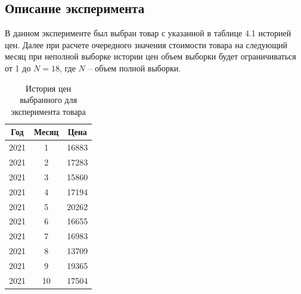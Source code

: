 \documentclass[a4paper,14pt]{extreport}
\begin{document}
\subsection{Описание эксперимента}

В данном эксперименте был выбран товар с указанной в таблице 4.1 историей цен. Далее при расчете очередного значения стоимости товара на следующий месяц при неполной выборке истории цен объем выборки будет ограничиваться от 1 до $N = 18$, где $N$ -- объем полной выборки.

\captionsetup{singlelinecheck = false, justification=raggedright}
\begin{table}[H]
	\caption{История цен выбранного для эксперимента товара}
	\begin{center}
		\begin{tabular}{| c | c | c |} 
			\hline
			
			\textbf{Год} & \textbf{Месяц} & \textbf{Цена} \\  
			
			\hline
			
			2021 & 1 & 16883 \\
			
			\hline
			
			2021 & 2 & 17283 \\
			
			\hline
			
			2021 & 3 & 15860 \\
			
			\hline
			
			2021 & 4 & 17194 \\
			
			\hline
			
			2021 & 5 & 20262 \\
			
			\hline
			
			2021 & 6 & 16655 \\
			
			\hline
			
			2021 & 7 & 16983 \\
			
			\hline
			
			2021 & 8 & 13709 \\
			
			\hline
			
			2021 & 9 & 19365 \\
			
			\hline
			
			2021 & 10 & 17504 \\
			

\end{tabular}
\end{center}
\end{table}
\end{document}
